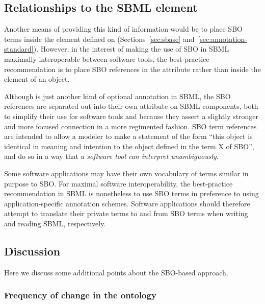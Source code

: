 \begin{blockChanged}
\subsection{Relationships to the SBML  element}

Another means of providing this kind of information would be to
place SBO terms inside the  element
defined on \SBase (Sections~\ref{sec:sbase} and~\ref{sec:annotation-standard}).
However, in the interest of making the use of SBO in SBML
maximally interoperable between software tools, the best-practice
recommendation is to place SBO references in the 
attribute rather than inside the 
element of an object.

Although  is just another kind of optional
annotation in SBML, the SBO references are separated out into
their own attribute on SBML components, both to simplify their use
for software tools and because they assert a slightly stronger and
more focused connection in a more regimented fashion.  SBO term
references are intended to allow a modeler to make a statement of
the form ``this object is identical in meaning and intention to
the object defined in the term X of SBO'', and do so in a way
that a \emph{software tool can interpret unambiguously}.

Some software applications may have their own vocabulary of terms
similar in purpose to SBO.  For maximal software interoperability,
the best-practice recommendation in SBML is nonetheless to use SBO
terms in preference to using application-specific annotation
schemes.  Software applications should therefore attempt to
translate their private terms to and from SBO terms when writing
and reading SBML, respectively.

\end{blockChanged}

\subsection{Discussion}

Here we discuss some additional points about the SBO-based
approach.

\subsubsection{Frequency of change in the ontology}
\label{sec:sbo-frequency-of-change}

